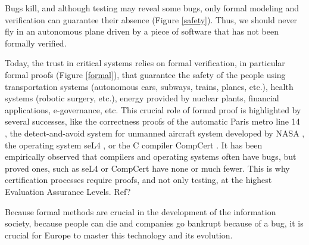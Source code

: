 \thispagestyle{empty}

Bugs kill, and although testing may reveal some bugs, only formal
modeling and verification can guarantee their absence (Figure
\ref{safety}).  Thus, we should never fly in an autonomous plane driven by a
piece of software that has not been formally verified.

Today, the trust in critical systems relies on formal verification, in
particular formal proofs (Figure \ref{formal}), that guarantee the
safety of the people using transportation systems (autonomous cars,
subways, trains, planes, etc.), health systems (robotic surgery,
etc.), energy provided by nuclear plants, financial applications,
e-governance, etc. This crucial role of formal proof is highlighted by
several successes, like the correctness proofs of the automatic Paris
metro line 14 \cite{metro14}, the detect-and-avoid system for unmanned
aircraft system developed by NASA \cite{Munoz16}, the operating system
seL4 \cite{Klein09}, or the C compiler CompCert \cite{Leroy06}.  It
has been empirically observed that compilers and operating systems
often have bugs, but proved ones, such as seL4 or CompCert have none
or much fewer.  This is why certification processes require proofs,
and not only testing, at the highest Evaluation Assurance Levels.
{\color{red} Ref?}

Because formal methods are crucial in the development of the
information society, because people can die and companies go bankrupt
because of a bug, it is crucial for Europe to master this technology
and its evolution.

